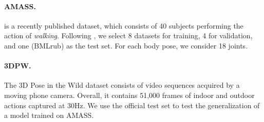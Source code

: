 \documentclass{article}
\begin{document}
\paragraph{AMASS.} \cite{mahmood2019amass} is a recently published dataset, which consists of 40 subjects performing the action of \textit{walking}. Following \cite{sofianos2021space,mao2021multi}, we select 8 datasets for training, 4 for validation, and one (BMLrub) as the test set. For each body pose, we consider 18 joints.
\paragraph{3DPW.} The 3D Pose in the Wild dataset \cite{von2018recovering} consists of video sequences acquired by a moving phone camera. Overall, it contains 51,000 frames of indoor and outdoor actions captured at 30Hz. We use the official test set to test the generalization of a model trained on AMASS. 
\end{document}
